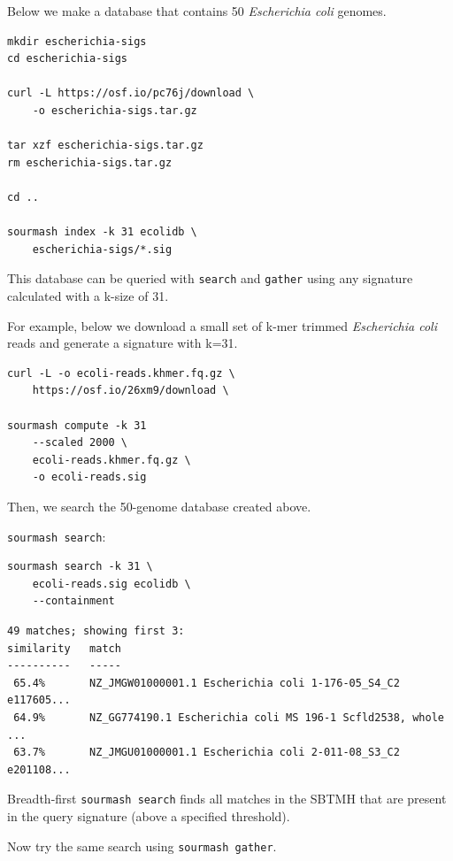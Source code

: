 \documentclass[10pt,a4paper,twocolumn]{article}
\begin{document}
\bigskip

Below we make a database that contains 50 \textit{Escherichia coli} genomes.


\begin{lstlisting}
mkdir escherichia-sigs
cd escherichia-sigs

curl -L https://osf.io/pc76j/download \ 
    -o escherichia-sigs.tar.gz    

tar xzf escherichia-sigs.tar.gz
rm escherichia-sigs.tar.gz

cd ..

sourmash index -k 31 ecolidb \ 
    escherichia-sigs/*.sig
\end{lstlisting}

\smallskip

This database can be queried with \lstinline{search} and \lstinline{gather} using any signature calculated with a k-size of 31.


For example, below we download a small set of k-mer trimmed \textit{Escherichia coli} reads and generate a signature with k=31.

\smallskip

\begin{lstlisting}
curl -L -o ecoli-reads.khmer.fq.gz \ 
    https://osf.io/26xm9/download \ 
    
sourmash compute -k 31 
    --scaled 2000 \ 
    ecoli-reads.khmer.fq.gz \  
    -o ecoli-reads.sig
\end{lstlisting}

Then, we search the 50-genome database created above.

\lstinline{sourmash search}: 

\begin{lstlisting}
sourmash search -k 31 \
    ecoli-reads.sig ecolidb \  
    --containment
\end{lstlisting}

\begin{lstlisting}[basicstyle=\tiny]
49 matches; showing first 3:
similarity   match
----------   -----
 65.4%       NZ_JMGW01000001.1 Escherichia coli 1-176-05_S4_C2 e117605...
 64.9%       NZ_GG774190.1 Escherichia coli MS 196-1 Scfld2538, whole ...
 63.7%       NZ_JMGU01000001.1 Escherichia coli 2-011-08_S3_C2 e201108...
\end{lstlisting}

Breadth-first \lstinline{sourmash search} finds all matches in the SBTMH that are present in the query signature (above a specified threshold).

Now try the same search using \lstinline{sourmash gather}.
\end{document}
